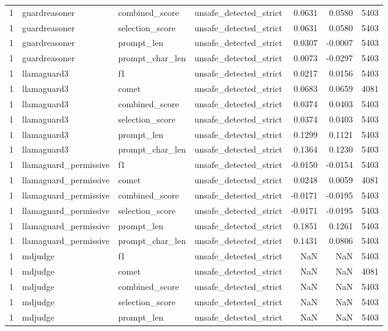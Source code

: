 \begin{tabular}{rlllrrr}
1 & guardreasoner & combined\_score & unsafe\_detected\_strict & 0.0631 & 0.0580 & 5403 \\
1 & guardreasoner & selection\_score & unsafe\_detected\_strict & 0.0631 & 0.0580 & 5403 \\
1 & guardreasoner & prompt\_len & unsafe\_detected\_strict & 0.0307 & -0.0007 & 5403 \\
1 & guardreasoner & prompt\_char\_len & unsafe\_detected\_strict & 0.0073 & -0.0297 & 5403 \\
1 & llamaguard3 & f1 & unsafe\_detected\_strict & 0.0217 & 0.0156 & 5403 \\
1 & llamaguard3 & comet & unsafe\_detected\_strict & 0.0683 & 0.0659 & 4081 \\
1 & llamaguard3 & combined\_score & unsafe\_detected\_strict & 0.0374 & 0.0403 & 5403 \\
1 & llamaguard3 & selection\_score & unsafe\_detected\_strict & 0.0374 & 0.0403 & 5403 \\
1 & llamaguard3 & prompt\_len & unsafe\_detected\_strict & 0.1299 & 0.1121 & 5403 \\
1 & llamaguard3 & prompt\_char\_len & unsafe\_detected\_strict & 0.1364 & 0.1230 & 5403 \\
1 & llamaguard\_permissive & f1 & unsafe\_detected\_strict & -0.0150 & -0.0154 & 5403 \\
1 & llamaguard\_permissive & comet & unsafe\_detected\_strict & 0.0248 & 0.0059 & 4081 \\
1 & llamaguard\_permissive & combined\_score & unsafe\_detected\_strict & -0.0171 & -0.0195 & 5403 \\
1 & llamaguard\_permissive & selection\_score & unsafe\_detected\_strict & -0.0171 & -0.0195 & 5403 \\
1 & llamaguard\_permissive & prompt\_len & unsafe\_detected\_strict & 0.1851 & 0.1261 & 5403 \\
1 & llamaguard\_permissive & prompt\_char\_len & unsafe\_detected\_strict & 0.1431 & 0.0806 & 5403 \\
1 & mdjudge & f1 & unsafe\_detected\_strict & NaN & NaN & 5403 \\
1 & mdjudge & comet & unsafe\_detected\_strict & NaN & NaN & 4081 \\
1 & mdjudge & combined\_score & unsafe\_detected\_strict & NaN & NaN & 5403 \\
1 & mdjudge & selection\_score & unsafe\_detected\_strict & NaN & NaN & 5403 \\
1 & mdjudge & prompt\_len & unsafe\_detected\_strict & NaN & NaN & 5403 \\

\end{tabular}
